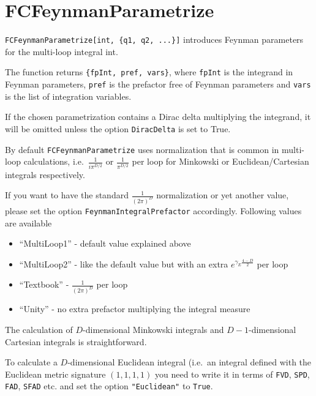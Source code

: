 \documentclass[../FeynCalcManual.tex]{subfiles}
\begin{document}
\hypertarget{fcfeynmanparametrize}{%
\section{FCFeynmanParametrize}\label{fcfeynmanparametrize}}

\texttt{FCFeynmanParametrize[\allowbreak{}int,\ \allowbreak{}\{\allowbreak{}q1,\ \allowbreak{}q2,\ \allowbreak{}...\}]}
introduces Feynman parameters for the multi-loop integral int.

The function returns
\texttt{\{\allowbreak{}fpInt,\ \allowbreak{}pref,\ \allowbreak{}vars\}},
where \texttt{fpInt} is the integrand in Feynman parameters,
\texttt{pref} is the prefactor free of Feynman parameters and
\texttt{vars} is the list of integration variables.

If the chosen parametrization contains a Dirac delta multiplying the
integrand, it will be omitted unless the option \texttt{DiracDelta} is
set to True.

By default \texttt{FCFeynmanParametrize} uses normalization that is
common in multi-loop calculations, i.e.~\(\frac{1}{i \pi^{D/2}}\) or
\(\frac{1}{\pi^{D/2}}\) per loop for Minkowski or Euclidean/Cartesian
integrals respectively.

If you want to have the standard \(\frac{1}{(2 \pi)^D}\) normalization
or yet another value, please set the option
\texttt{FeynmanIntegralPrefactor} accordingly. Following values are
available

\begin{itemize}
\tightlist
\item
  ``MultiLoop1'' - default value explained above
\item
  ``MultiLoop2'' - like the default value but with an extra
  \(e^{\gamma_E \frac{4-D}{2}}\) per loop
\item
  ``Textbook'' - \(\frac{1}{(2 \pi)^D}\) per loop
\item
  ``Unity'' - no extra prefactor multiplying the integral measure
\end{itemize}

The calculation of \(D\)-dimensional Minkowski integrals and
\(D-1\)-dimensional Cartesian integrals is straightforward.

To calculate a \(D\)-dimensional Euclidean integral (i.e.~an integral
defined with the Euclidean metric signature \((1,1,1,1)\) you need to
write it in terms of \texttt{FVD}, \texttt{SPD}, \texttt{FAD},
\texttt{SFAD} etc. and set the option \texttt{"Euclidean"} to
\texttt{True}.
\end{document}
